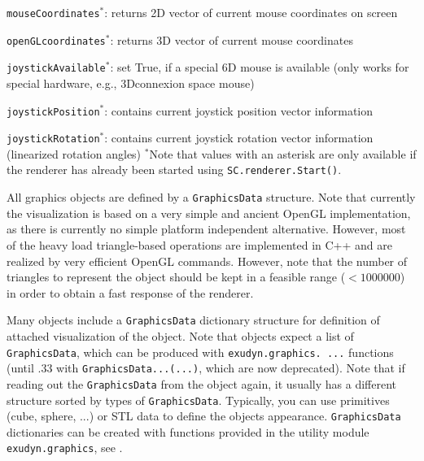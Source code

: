   \item \texttt{mouseCoordinates}$^*$: returns 2D vector of current mouse coordinates on screen
  \item \texttt{openGLcoordinates}$^*$: returns 3D vector of current mouse coordinates
  \item \texttt{joystickAvailable}$^*$: set True, if a special 6D mouse is available (only works for special hardware, e.g., 3Dconnexion space mouse)
  \item \texttt{joystickPosition}$^*$: contains current joystick position vector information 
  \item \texttt{joystickRotation}$^*$: contains current joystick rotation vector information (linearized rotation angles)
\ei
$^*$Note that values with an asterisk are only available if the renderer has already been started using \texttt{SC.renderer.Start()}.

\newpage %
All graphics objects are defined by a \texttt{GraphicsData} structure. %
Note that currently the visualization is based on a very simple and ancient OpenGL implementation, as there is currently no simple platform independent alternative. However, most of the heavy load triangle-based operations are implemented in C++ and are realized by very efficient OpenGL commands. However, note that the number of triangles to represent the object should be kept in a feasible range ($<1000000$) in order to obtain a fast response of the renderer.

Many objects include a \texttt{GraphicsData} dictionary structure for definition of attached visualization of the object.
Note that objects expect a list of \texttt{GraphicsData}, which can be produced with \texttt{exudyn.graphics. ...} functions (until .33 with \texttt{GraphicsData...(...)}, which are now deprecated). 
Note that if reading out the \texttt{GraphicsData} from the object again, it usually has a different structure sorted by types of \texttt{GraphicsData}.
Typically, you can use primitives (cube, sphere, ...) or \ac{STL} data to define the objects appearance.
\texttt{GraphicsData} dictionaries can be created with functions provided in the utility module \texttt{exudyn.graphics}, see .

